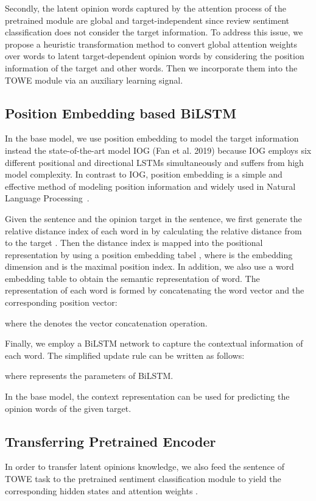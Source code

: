 \documentclass[letterpaper]{article} \usepackage{aaai20}  \usepackage{times}  \usepackage{helvet} \usepackage{courier}  \usepackage[hyphens]{url}  \usepackage{graphicx} \urlstyle{rm} \def\UrlFont{\rm}  \usepackage{graphicx}
\begin{document}
Secondly, the latent opinion words captured by the attention process of the pretrained module are global and target-independent since review sentiment classification does not consider the target information. To address this issue, we propose a heuristic transformation method to convert global attention weights over words to latent target-dependent opinion words by considering the position information of the target and other words. Then we incorporate them into the TOWE module via an auxiliary learning signal.

\subsection{Position Embedding based BiLSTM}
In the base model, we use position embedding to model the target information instead the state-of-the-art model IOG (Fan et al. 2019) because IOG employs six different positional and directional LSTMs simultaneously and suffers from high model complexity. In contrast to IOG, position embedding is a simple and effective method of modeling position information and widely used in Natural Language Processing~\cite{DBLP:conf/acl/LinSLLS16,DBLP:conf/acl/GehringAGD17,DBLP:conf/nips/VaswaniSPUJGKP17,DBLP:conf/coling/GuZHS18}.

Given the sentence   and the opinion target  in the sentence, we first generate the relative distance index  of each word  in  by calculating the relative distance from  to the target . Then the distance index  is mapped into the positional representation by using a position embedding tabel  , where  is the embedding dimension and  is the maximal position index. In addition, we also use a word embedding table  to obtain the semantic representation of word. The representation  of each word  is formed by concatenating the word vector and the corresponding position vector:

where the  denotes the vector concatenation operation.

Finally, we employ a BiLSTM network to capture the contextual information of each word. The simplified update rule can be written as follows:

where  represents the parameters of BiLSTM.

In the base model, the context representation  can be used for predicting the opinion words of the given target.

\subsection{Transferring Pretrained Encoder}
In order to transfer latent opinions knowledge, we also feed the sentence  of TOWE task to the pretrained sentiment classification module to yield the corresponding hidden states  and attention weights .
\end{document}
